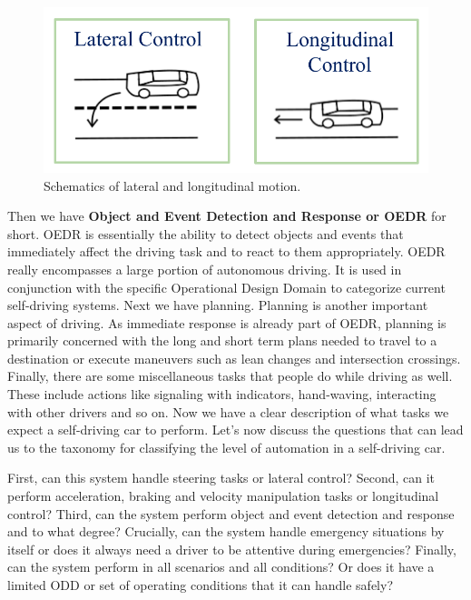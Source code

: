 \begin{figure}[!htb]
\begin{center}
\includegraphics[scale=0.280]{img/intro_self_driving/lateral_longitu_control.jpeg}
\end{center}
\caption{Schematics of lateral and longitudinal motion.}
\label{lateral_longitu_control}
\end{figure}


Then we have {\textbf{Object and Event Detection and Response or OEDR}} for short. 
OEDR is essentially the ability to detect objects and events that immediately affect the driving task and to react to them appropriately. 
OEDR really encompasses a large portion of autonomous driving. 
It is used in conjunction with the specific Operational Design Domain to categorize current self-driving systems. 
Next we have planning. Planning is another important aspect of driving. As immediate response is already part of OEDR, planning is primarily concerned with the long and 
short term plans needed to travel to a destination or execute maneuvers such as lean changes and intersection crossings. 
Finally, there are some miscellaneous tasks that people do while driving as well. 
These include actions like signaling with indicators, hand-waving, interacting with other drivers and so on. 
Now we have a clear description of what tasks we expect a self-driving car to perform. Let's now discuss the questions that can lead us to the taxonomy for classifying the 
level of automation in a self-driving car. 

First, can this system handle steering tasks or lateral control? Second, can it perform acceleration, braking and velocity manipulation tasks or longitudinal control? 
Third, can the system perform object and event detection and response and to what degree? Crucially, can the system handle emergency situations by itself or does it always 
need a driver to be attentive during emergencies? Finally, can the system perform in all scenarios and all conditions? Or does it have a limited ODD or set of operating conditions that 
it can handle safely? 

